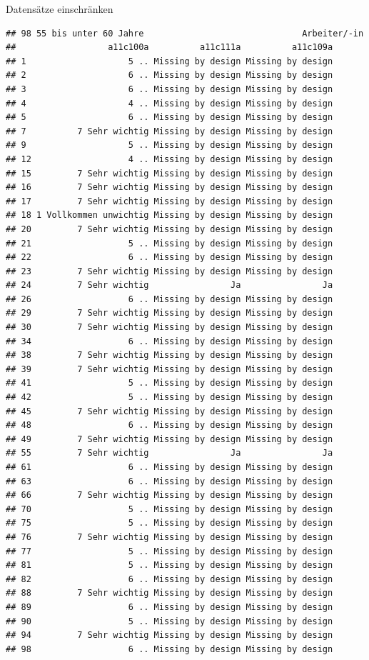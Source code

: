 \documentclass[ignorenonframetext,]{beamer}
\begin{document}
\begin{frame}[fragile]{Datensätze einschränken}
\begin{verbatim}
## 98 55 bis unter 60 Jahre                               Arbeiter/-in
##                  a11c100a          a11c111a          a11c109a
## 1                    5 .. Missing by design Missing by design
## 2                    6 .. Missing by design Missing by design
## 3                    6 .. Missing by design Missing by design
## 4                    4 .. Missing by design Missing by design
## 5                    6 .. Missing by design Missing by design
## 7          7 Sehr wichtig Missing by design Missing by design
## 9                    5 .. Missing by design Missing by design
## 12                   4 .. Missing by design Missing by design
## 15         7 Sehr wichtig Missing by design Missing by design
## 16         7 Sehr wichtig Missing by design Missing by design
## 17         7 Sehr wichtig Missing by design Missing by design
## 18 1 Vollkommen unwichtig Missing by design Missing by design
## 20         7 Sehr wichtig Missing by design Missing by design
## 21                   5 .. Missing by design Missing by design
## 22                   6 .. Missing by design Missing by design
## 23         7 Sehr wichtig Missing by design Missing by design
## 24         7 Sehr wichtig                Ja                Ja
## 26                   6 .. Missing by design Missing by design
## 29         7 Sehr wichtig Missing by design Missing by design
## 30         7 Sehr wichtig Missing by design Missing by design
## 34                   6 .. Missing by design Missing by design
## 38         7 Sehr wichtig Missing by design Missing by design
## 39         7 Sehr wichtig Missing by design Missing by design
## 41                   5 .. Missing by design Missing by design
## 42                   5 .. Missing by design Missing by design
## 45         7 Sehr wichtig Missing by design Missing by design
## 48                   6 .. Missing by design Missing by design
## 49         7 Sehr wichtig Missing by design Missing by design
## 55         7 Sehr wichtig                Ja                Ja
## 61                   6 .. Missing by design Missing by design
## 63                   6 .. Missing by design Missing by design
## 66         7 Sehr wichtig Missing by design Missing by design
## 70                   5 .. Missing by design Missing by design
## 75                   5 .. Missing by design Missing by design
## 76         7 Sehr wichtig Missing by design Missing by design
## 77                   5 .. Missing by design Missing by design
## 81                   5 .. Missing by design Missing by design
## 82                   6 .. Missing by design Missing by design
## 88         7 Sehr wichtig Missing by design Missing by design
## 89                   6 .. Missing by design Missing by design
## 90                   5 .. Missing by design Missing by design
## 94         7 Sehr wichtig Missing by design Missing by design
## 98                   6 .. Missing by design Missing by design
\end{verbatim}

\end{frame}
\end{document}
